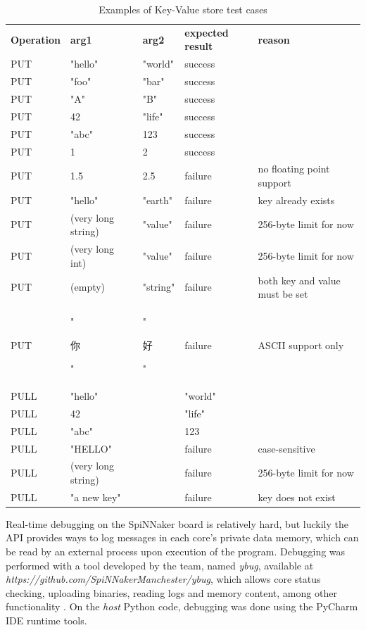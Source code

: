 \begin{table}
\begin{tabular}{ l | l | l | l | l }
\textbf{Operation} & \textbf{arg1} & \textbf{arg2} & \textbf{expected result} & \textbf{reason} \\
PUT & "hello" & "world" & success & \\
PUT & "foo" & "bar" & success & \\
PUT & "A" & "B" & success & \\
PUT & 42 & "life" & success & \\
PUT & "abc" & 123 &  success & \\
PUT & 1 & 2 & success & \\
PUT & 1.5 & 2.5 & failure & no floating point support\\
PUT & "hello" & "earth" & failure & key already exists \\
PUT & (very long string) & "value" & failure & 256-byte limit for now \\
PUT & (very long int) & "value" & failure & 256-byte limit for now \\
PUT & (empty) & "string" & failure & both key and value must be set \\
PUT & "\begin{CJK*}{UTF8}{bsmi}你\end{CJK*}" & "\begin{CJK*}{UTF8}{bsmi}好\end{CJK*}" & failure & ASCII support only \\
PULL & "hello" & & "world" & \\
PULL & 42 & & "life" & \\
PULL & "abc" & & 123 & \\
PULL & "HELLO" & & failure & case-sensitive \\
PULL & (very long string) & & failure & 256-byte limit for now \\
PULL & "a new key" & & failure & key does not exist \\
\end{tabular}
\caption{Examples of Key-Value store test cases}
\label{table:tests}
\end{table}

Real-time debugging on the SpiNNaker board is relatively hard, but luckily the API provides ways to log messages in each core's private data memory, which can be read by an external process upon execution of the program. Debugging was performed with a tool developed by the team, named \textit{ybug}, available at \textit{https://github.com/SpiNNakerManchester/ybug}, which allows core status checking, uploading binaries, reading logs and memory content, among other functionality \cite{ybug}. On the \textit{host} Python code, debugging was done using the PyCharm IDE runtime tools.

